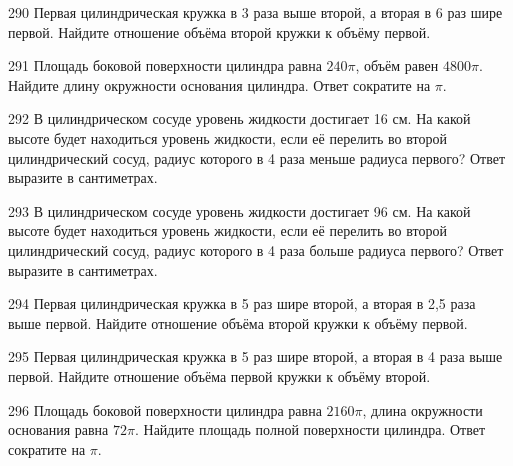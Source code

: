 \documentclass[4apaper]{article}
\begin{document}
\begin{taskBN}{290}
 Первая цилиндрическая кружка в 3 раза выше второй, а вторая в 6 раз шире первой. Найдите отношение объёма второй кружки к объёму первой.
\end{taskBN}

\begin{taskBN}{291}
Площадь боковой поверхности цилиндра равна $240\pi$, объём равен $4800\pi$. Найдите длину окружности основания цилиндра. Ответ сократите на $\pi$.
\end{taskBN}

\begin{taskBN}{292}
В цилиндрическом сосуде уровень жидкости достигает 16 см. На какой высоте будет находиться уровень жидкости, если её перелить во второй цилиндрический сосуд, радиус которого в 4 раза меньше радиуса первого? Ответ выразите в сантиметрах.
\end{taskBN}

\begin{taskBN}{293}
В цилиндрическом сосуде уровень жидкости достигает 96 см. На какой высоте будет находиться уровень жидкости, если её перелить во второй цилиндрический сосуд, радиус которого в 4 раза больше радиуса первого? Ответ выразите в сантиметрах.
\end{taskBN}

\begin{taskBN}{294}
 Первая цилиндрическая кружка в 5 раз шире второй, а вторая в 2,5 раза выше первой. Найдите отношение объёма второй кружки к объёму первой.
\end{taskBN}

\begin{taskBN}{295}
 Первая цилиндрическая кружка в 5 раз шире второй, а вторая в 4 раза выше первой. Найдите отношение объёма первой кружки к объёму второй.
\end{taskBN}

\begin{taskBN}{296}
Площадь боковой поверхности цилиндра равна $2160\pi$, длина окружности основания равна $72\pi$. Найдите площадь полной поверхности цилиндра. Ответ сократите на $\pi$.
\end{taskBN}
\end{document}
